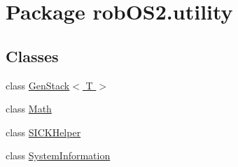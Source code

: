 \hypertarget{namespacerob_o_s2_1_1utility}{
\section{Package robOS2.utility}
\label{namespacerob_o_s2_1_1utility}
}
\subsection*{Classes}
\begin{DoxyCompactItemize}
\item 
class \hyperlink{classrob_o_s2_1_1utility_1_1_gen_stack_3_01_t_01_4}{GenStack$<$ T $>$}
\item 
class \hyperlink{classrob_o_s2_1_1utility_1_1_math}{Math}
\item 
class \hyperlink{classrob_o_s2_1_1utility_1_1_s_i_c_k_helper}{SICKHelper}
\item 
class \hyperlink{classrob_o_s2_1_1utility_1_1_system_information}{SystemInformation}
\end{DoxyCompactItemize}
